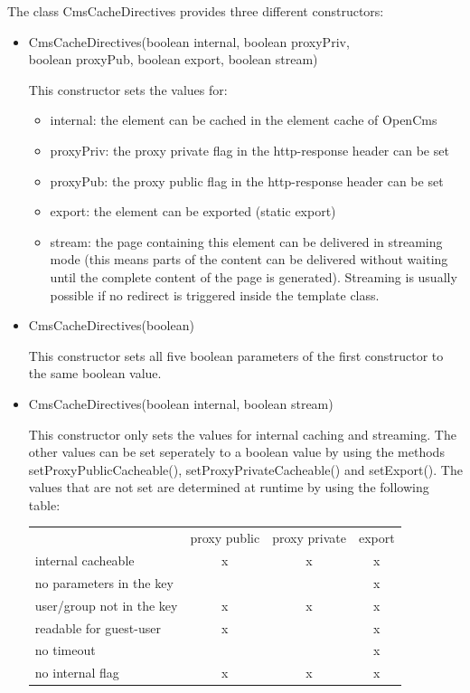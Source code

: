 The class {\class CmsCacheDirectives} provides three different constructors:
\begin{itemize}
\item 
\begin{java}
CmsCacheDirectives(boolean internal, boolean proxyPriv,\\
\jtabb      boolean proxyPub, boolean export, boolean stream)\\
\end{java}

This constructor sets the values for:
\begin{itemize}
\item internal: the element can be cached in the element cache of OpenCms
\item proxyPriv: the proxy private flag in the http-response header can be set
\item proxyPub: the proxy public flag in the http-response header can be set
\item export: the element can be exported (static export)
\item stream: the page containing this element can be delivered in streaming mode 
(this means parts of the content can be delivered without waiting until the complete 
content of the page is generated). 
Streaming is usually possible if no redirect is triggered  inside the template class.
\end{itemize}
\item 
\begin{java}
CmsCacheDirectives(boolean)\\
\end{java}
This constructor sets all five boolean parameters of the first constructor to the same boolean value.
\item
\begin{java}
CmsCacheDirectives(boolean internal, boolean stream)\\
\end{java}

This constructor only sets the values for internal caching and streaming. 
The other values can be set seperately to a boolean value by using the methods\\ 
{\meth setProxyPublicCacheable()}, {\meth setProxyPrivateCacheable()} and {\meth setExport()}. 
The values that are not set are determined at runtime by using the following table:


\begin{tabular}{lccc}
& proxy public & proxy private & export \\[0.5ex]
internal cacheable & x & x & x \\
no parameters in the key & & & x \\
user/group not in the key & x & x & x \\
readable for guest-user & x & & x \\
no timeout & & & x \\
no internal flag & x & x & x \\
\end{tabular}


\end{itemize}
